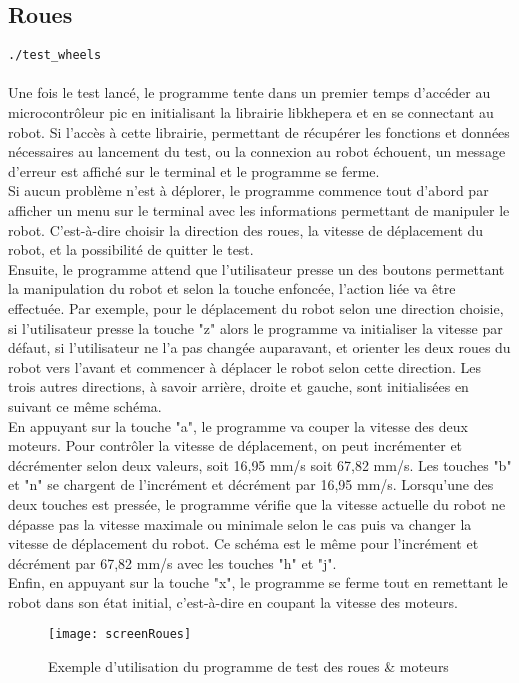 \documentclass[11pt]{article} %
\begin{document}
\subsection{Roues}
\verb|./test_wheels|\\
 \\
Une fois le test lancé, le programme tente dans un premier temps d’accéder au microcontrôleur pic en initialisant la librairie libkhepera et en se connectant au robot. Si l’accès à cette librairie, permettant de récupérer les fonctions et données nécessaires au lancement du test, ou la connexion au robot échouent, un message d’erreur est affiché sur le terminal et le programme se ferme.\\
Si aucun problème n’est à déplorer, le programme commence tout d’abord par afficher un menu sur le terminal avec les informations permettant de manipuler le robot. C’est-à-dire choisir la direction des roues, la vitesse de déplacement du robot, et la possibilité de quitter le test. \\
Ensuite, le programme attend que l’utilisateur presse un des boutons permettant la manipulation du robot et selon la touche enfoncée, l’action liée va être effectuée. Par exemple, pour le déplacement du robot selon une direction choisie, si l’utilisateur presse la touche "z" alors le programme va initialiser la vitesse par défaut, si l’utilisateur ne l’a pas changée auparavant, et orienter les deux roues du robot vers l’avant et commencer à déplacer le robot selon cette direction. Les trois autres directions, à savoir arrière, droite et gauche, sont initialisées en suivant ce même schéma. \\
En appuyant sur la touche "a", le programme va couper la vitesse des deux moteurs. Pour contrôler la vitesse de déplacement, on peut incrémenter et décrémenter selon deux valeurs, soit 16,95 mm/s soit 67,82 mm/s. Les touches "b" et "n" se chargent de l’incrément et décrément par 16,95 mm/s. Lorsqu’une des deux touches est pressée, le programme vérifie que la vitesse actuelle du robot ne dépasse pas la vitesse maximale ou minimale selon le cas puis va changer la vitesse de déplacement du robot. Ce schéma est le même pour l’incrément et décrément par 67,82 mm/s avec les touches "h" et "j".\\
Enfin, en appuyant sur la touche "x", le programme se ferme tout en remettant le robot dans son état initial, c’est-à-dire en coupant la vitesse des moteurs.
\begin{figure}[H]
	\caption{Exemple d'utilisation du programme de test des roues \& moteurs}
	\texttt{[image: screenRoues]}
\end{figure}
\end{document}
